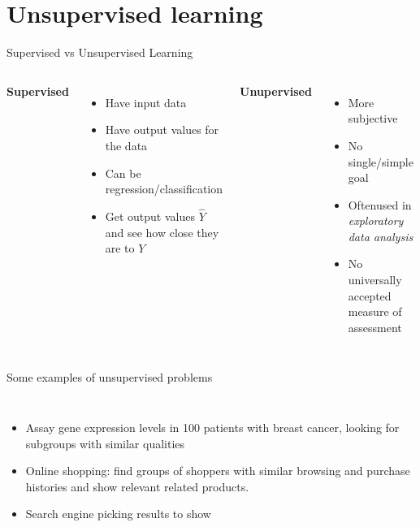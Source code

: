 \documentclass[aspectratio=169,usenames,dvipsnames]{beamer}
\newcommand{\InstructorList}[1]{
\begin{itemize}
	\color{orange}
	#1
\end{itemize}
}
\begin{document}
\section{Unsupervised learning}


\begin{frame}[t]{Supervised vs Unsupervised Learning}

\begin{columns}
\centering
\textbf{Supervised}
\InstructorList{
  \item Have input data
	\item Have output values for the data
	\item Can be regression/classification
	\item Get output values $\hat Y$ and see how close they are to $Y$
}


\centering
\textbf{Unupervised}

\InstructorList{
  \item More subjective
	\item No single/simple goal
	\item Oftenused in \textit{exploratory data analysis}
	\item No universally accepted measure of assessment


}






\end{columns}

\end{frame}


\begin{frame}[t]{Some examples of unsupervised problems}

\begin{columns}
\centering

\begin{itemize}
	\item Assay gene expression levels in 100 patients with breast cancer, looking for subgroups with similar qualities
	\item Online shopping: find groups of shoppers with similar browsing and purchase histories and show relevant related products.
	\item Search engine picking results to show
\end{itemize}


\centering

\end{columns}

\end{frame}
\end{document}
